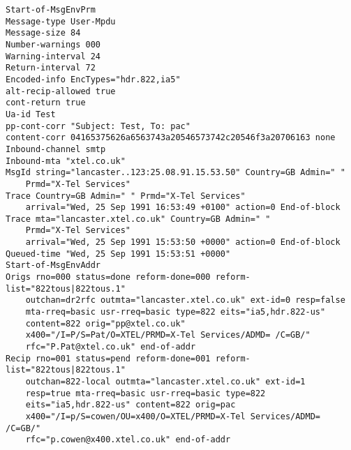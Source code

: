 \small\begin{verbatim}
Start-of-MsgEnvPrm
Message-type User-Mpdu
Message-size 84
Number-warnings 000
Warning-interval 24
Return-interval 72
Encoded-info EncTypes="hdr.822,ia5"
alt-recip-allowed true
cont-return true
Ua-id Test
pp-cont-corr "Subject: Test, To: pac"
content-corr 04165375626a6563743a20546573742c20546f3a20706163 none
Inbound-channel smtp
Inbound-mta "xtel.co.uk"
MsgId string="lancaster..123:25.08.91.15.53.50" Country=GB Admin=" "
	Prmd="X-Tel Services"
Trace Country=GB Admin=" " Prmd="X-Tel Services"
	arrival="Wed, 25 Sep 1991 16:53:49 +0100" action=0 End-of-block
Trace mta="lancaster.xtel.co.uk" Country=GB Admin=" "
	Prmd="X-Tel Services"
	arrival="Wed, 25 Sep 1991 15:53:50 +0000" action=0 End-of-block
Queued-time "Wed, 25 Sep 1991 15:53:51 +0000"
Start-of-MsgEnvAddr
Origs rno=000 status=done reform-done=000 reform-list="822tous|822tous.1"
	outchan=dr2rfc outmta="lancaster.xtel.co.uk" ext-id=0 resp=false
	mta-rreq=basic usr-rreq=basic type=822 eits="ia5,hdr.822-us"
	content=822 orig="pp@xtel.co.uk"
	x400="/I=P/S=Pat/O=XTEL/PRMD=X-Tel Services/ADMD= /C=GB/"
	rfc="P.Pat@xtel.co.uk" end-of-addr
Recip rno=001 status=pend reform-done=001 reform-list="822tous|822tous.1"
	outchan=822-local outmta="lancaster.xtel.co.uk" ext-id=1
	resp=true mta-rreq=basic usr-rreq=basic type=822
	eits="ia5,hdr.822-us" content=822 orig=pac
	x400="/I=p/S=cowen/OU=x400/O=XTEL/PRMD=X-Tel Services/ADMD= /C=GB/"
	rfc="p.cowen@x400.xtel.co.uk" end-of-addr
\end{verbatim}

